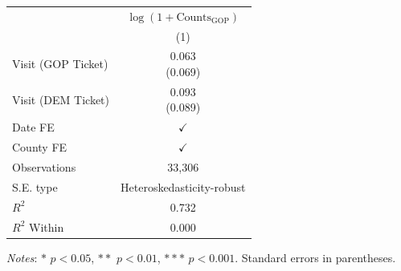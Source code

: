 \renewcommand\cellalign{t}
\begin{threeparttable}
\begin{tabular}{lc}
\toprule
 & \multicolumn{1}{c}{$\log(1+\text{Counts}_{\text{GOP}})$} \\
\cmidrule(lr){2-2}
 & (1) \\
\midrule
\addlinespace
Visit (GOP Ticket) & \makecell{0.063 \\ (0.069)} \\
Visit (DEM Ticket) & \makecell{0.093 \\ (0.089)} \\
\midrule
\addlinespace
Date FE   & $\checkmark$ \\
County FE & $\checkmark$ \\
\midrule
\addlinespace
Observations & 33,306 \\
S.E. type    & Heteroskedasticity-robust \\
$R^2$        & 0.732 \\
$R^2$ Within & 0.000 \\
\bottomrule
\end{tabular}
\begin{tablenotes}
\footnotesize
\item \textit{Notes}: $*$ $p<0.05$, $**$ $p<0.01$, $***$ $p<0.001$.
      Standard errors in parentheses.
\end{tablenotes}
\end{threeparttable}
